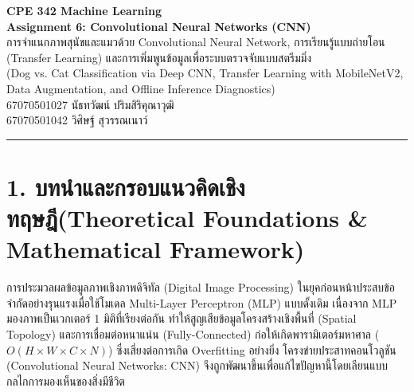 \documentclass[12pt,a4paper]{article}
\begin{document}
\begin{center}
    {\Large\textbf{CPE 342 Machine Learning}}\\[2pt]
    {\Large\textbf{Assignment 6: Convolutional Neural Networks (CNN)}}\\[4pt]
    {\large การจำแนกภาพสุนัขและแมวด้วย Convolutional Neural Network, การเรียนรู้แบบถ่ายโอน (Transfer Learning) และการเพิ่มพูนข้อมูลเพื่อระบบตรวจจับแบบสตรีมมิ่ง}\\[2pt]
    {\normalsize (Dog vs. Cat Classification via Deep CNN, Transfer Learning with MobileNetV2, Data Augmentation, and Offline Inference Diagnostics)}\\[6pt]
    \textcolor{accentblue}{67070501027 นัธทวัฒน์ ปริมสิริคุณาวุฒิ}\\[2pt]
    \textcolor{accentblue}{67070501042 วิศิษฐ์ สุวรรณเนาว์}
\end{center}

\vspace{0.5em}
\hrule
\vspace{1em}

\section*{1. บทนำและกรอบแนวคิดเชิงทฤษฎี\newline \large(Theoretical Foundations \& Mathematical Framework)}

การประมวลผลข้อมูลภาพเชิงภาพดิจิทัล (Digital Image Processing) ในยุคก่อนหน้าประสบข้อจำกัดอย่างรุนแรงเมื่อใช้โมเดล Multi-Layer Perceptron (MLP) แบบดั้งเดิม เนื่องจาก MLP มองภาพเป็นเวกเตอร์ 1 มิติที่เรียงต่อกัน ทำให้สูญเสียข้อมูลโครงสร้างเชิงพื้นที่ (Spatial Topology) และการเชื่อมต่อหนาแน่น (Fully-Connected) ก่อให้เกิดพารามิเตอร์มหาศาล ($O(H \times W \times C \times N)$) ซึ่งเสี่ยงต่อการเกิด Overfitting อย่างยิ่ง โครงข่ายประสาทคอนโวลูชัน (Convolutional Neural Networks: CNN) จึงถูกพัฒนาขึ้นเพื่อแก้ไขปัญหานี้โดยเลียนแบบกลไกการมองเห็นของสิ่งมีชีวิต
\end{document}
